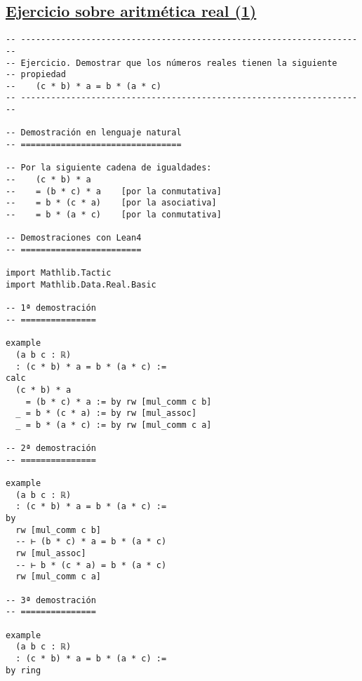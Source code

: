 \subsection{\href{./src/Basicos/Ejercicio\_sobre\_aritmetica\_real\_1.lean}{Ejercicio sobre aritmética real (1)}}
\label{sec:org69110da}
\begin{verbatim}
-- ---------------------------------------------------------------------
-- Ejercicio. Demostrar que los números reales tienen la siguiente
-- propiedad
--    (c * b) * a = b * (a * c)
-- ---------------------------------------------------------------------

-- Demostración en lenguaje natural
-- ================================

-- Por la siguiente cadena de igualdades:
--    (c * b) * a
--    = (b * c) * a    [por la conmutativa]
--    = b * (c * a)    [por la asociativa]
--    = b * (a * c)    [por la conmutativa]

-- Demostraciones con Lean4
-- ========================

import Mathlib.Tactic
import Mathlib.Data.Real.Basic

-- 1ª demostración
-- ===============

example
  (a b c : ℝ)
  : (c * b) * a = b * (a * c) :=
calc
  (c * b) * a
    = (b * c) * a := by rw [mul_comm c b]
  _ = b * (c * a) := by rw [mul_assoc]
  _ = b * (a * c) := by rw [mul_comm c a]

-- 2ª demostración
-- ===============

example
  (a b c : ℝ)
  : (c * b) * a = b * (a * c) :=
by
  rw [mul_comm c b]
  -- ⊢ (b * c) * a = b * (a * c)
  rw [mul_assoc]
  -- ⊢ b * (c * a) = b * (a * c)
  rw [mul_comm c a]

-- 3ª demostración
-- ===============

example
  (a b c : ℝ)
  : (c * b) * a = b * (a * c) :=
by ring
\end{verbatim}

